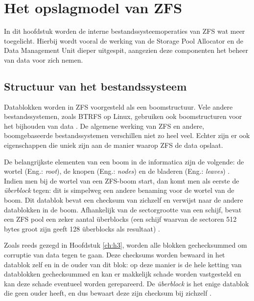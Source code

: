 

\chapter{Het opslagmodel van ZFS}
\label{ch:h4}

In dit hoofdstuk worden de interne bestandssysteemoperaties van ZFS wat meer toegelicht. Hierbij wordt vooral de werking van de Storage Pool Allocator en de Data Management Unit dieper uitgespit, aangezien deze componenten het beheer van data voor zich nemen.

\section{Structuur van het bestandssysteem}

Datablokken worden in ZFS voorgesteld als een boomstructuur. Vele andere bestandssystemen, zoals BTRFS op Linux, gebruiken ook boomstructuren voor het bijhouden van data \autocite{Project2017a}. De algemene werking van ZFS en andere, boomgebaseerde bestandssystemen verschillen niet zo heel veel. Echter zijn er ook eigenschappen die uniek zijn aan de manier waarop ZFS de data opslaat.

De belangrijkste elementen van een boom in de informatica zijn de volgende: de wortel (Eng.: \textit{root}), de knopen (Eng.: \textit{nodes}) en de bladeren (Eng.: \textit{leaves}) \autocite{Cohen}. Indien men bij de wortel van een ZFS-boom start, dan komt men als eerste de \textit{\"{u}berblock} tegen: dit is simpelweg een andere benaming voor de wortel van de boom. Dit datablok bevat een checksum van zichzelf en verwijst naar de andere datablokken in de boom. Afhankelijk van de sectorgrootte van een schijf, bevat een ZFS pool een zeker aantal \"{u}berblocks (een schijf waarvan de sectoren 512 bytes groot zijn geeft 128 \"{u}berblocks als resultaat) \autocite{Lucas2015}. 

Zoals reeds gezegd in Hoofdstuk \ref{ch:h3}, worden alle blokken gechecksummed om corruptie van data tegen te gaan. Deze checksums worden bewaard in het datablok zelf en in de ouder van dit blok: op deze manier is de hele ketting van datablokken gechecksummed en kan er makkelijk schade worden vastgesteld en kan deze schade eventueel worden gerepareerd. De \textit{\"{u}berblock} is het enige datablok die geen ouder heeft, en dus bewaart deze zijn checksum bij zichzelf \autocite{ZFSBonwick}.  

